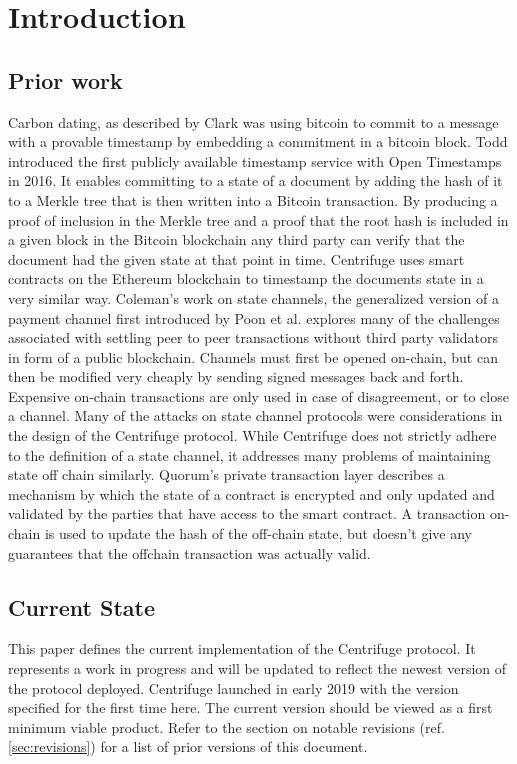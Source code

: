 \section{Introduction}
\subsection{Prior work}
Carbon dating, as described by Clark\cite{clark2012commitcoin} was using bitcoin to commit to a message with a provable timestamp by embedding a commitment in a bitcoin block. Todd\cite{todd2016opentimestamps} introduced the first publicly available timestamp service with Open Timestamps in 2016. It enables committing to a state of a document by adding the hash of it to a Merkle tree that is then written into a Bitcoin transaction. By producing a proof of inclusion in the Merkle tree and a proof that the root hash is included in a given block in the Bitcoin blockchain any third party can verify that the document had the given state at that point in time. Centrifuge uses smart contracts on the Ethereum blockchain to timestamp the documents state in a very similar way.
Coleman's work on state channels\cite{coleman2018counterfactual}, the generalized version of a payment channel first introduced by Poon et al.\cite{poon2016lightningnetwork} explores many of the challenges associated with settling peer to peer transactions without third party validators in form of a public blockchain. Channels must first be opened on-chain, but can then be modified very cheaply by sending signed messages back and forth. Expensive on-chain transactions are only used in case of disagreement, or to close a channel. Many of the attacks on state channel protocols were considerations in the design of the Centrifuge protocol. While Centrifuge does not strictly adhere to the definition of a state channel, it addresses many problems of maintaining state off chain similarly.
Quorum's private transaction layer\cite{quorumprivatetransactionwiki} describes a mechanism by which the state of a contract is encrypted and only updated and validated by the parties that have access to the smart contract. A transaction on-chain is used to update the hash of the off-chain state, but doesn't give any guarantees that the offchain transaction was actually valid.
\subsection{Current State}
This paper defines the current implementation of the Centrifuge protocol. It represents a work in progress and will be updated to reflect the newest version of the protocol deployed. Centrifuge launched in early 2019 with the version specified for the first time here. The current version should be viewed as a first minimum viable product. Refer to the section on notable revisions (ref. \ref{sec:revisions}) for a list of prior versions of this document.
